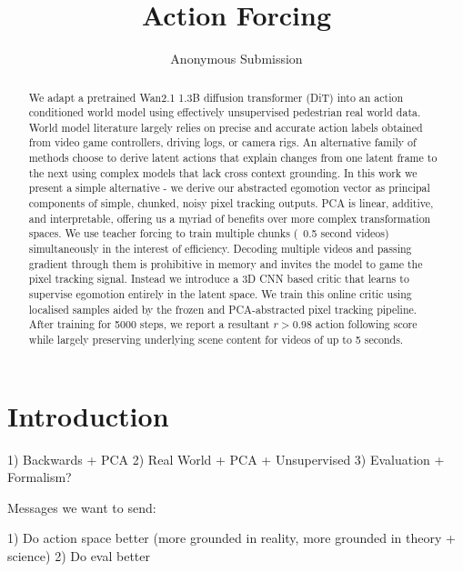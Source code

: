 \documentclass[letterpaper]{article} %
\title{Action Forcing}
\author{
    Anonymous Submission
}
\begin{document}
\maketitle

\begin{abstract}
We adapt a pretrained Wan2.1 1.3B diffusion transformer (DiT) into an action conditioned world model using effectively unsupervised pedestrian real world data. World model literature largely relies on precise and accurate action labels obtained from video game controllers, driving logs, or camera rigs. An alternative family of methods choose to derive latent actions that explain changes from one latent frame to the next using complex models that lack cross context grounding. In this work we present a simple alternative - we derive our abstracted egomotion vector as principal components of simple, chunked, noisy pixel tracking outputs. PCA is linear, additive, and interpretable, offering us a myriad of benefits over more complex transformation spaces. We use teacher forcing to train multiple chunks (~0.5 second videos) simultaneously in the interest of efficiency. Decoding multiple videos and passing gradient through them is prohibitive in memory and invites the model to game the pixel tracking signal. Instead we introduce a 3D CNN based critic that learns to supervise egomotion entirely in the latent space. We train this online critic using localised samples aided by the frozen and PCA-abstracted pixel tracking pipeline.
After training for 5000 steps, we report a resultant $r>0.98$ action following score while largely preserving underlying scene content for videos of up to 5 seconds.
\end{abstract}

\section{Introduction}

1) Backwards + PCA
2) Real World + PCA + Unsupervised
3) Evaluation + Formalism? 

Messages we want to send:

1) Do action space better (more grounded in reality, more grounded in theory + science) 
2) Do eval better
\end{document}
